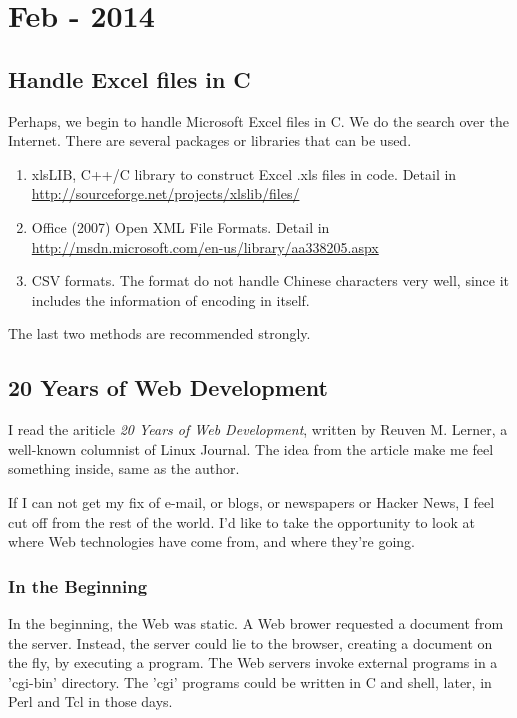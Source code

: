 
\chapter{Feb - 2014} %

\label{ch:feb:2014} %

\section{Handle Excel files in C}
Perhaps, we begin to handle Microsoft Excel files in C.
We do the search over the Internet.
There are several packages or libraries that can be used.
\begin{enumerate}
\item xlsLIB, C++/C library to construct Excel .xls files in code. 
Detail in \url{http://sourceforge.net/projects/xlslib/files/}
\item Office (2007) Open XML File Formats. Detail in \url{http://msdn.microsoft.com/en-us/library/aa338205.aspx}
\item CSV formats. The format do not handle Chinese characters very well, 
since it includes the information of encoding in itself.
\end{enumerate}
The last two methods are recommended strongly. 

\section{20 Years of Web Development}
I read the ariticle {\it 20 Years of Web Development}, written by Reuven M. Lerner, 
a well-known columnist of Linux Journal.
The idea from the article make me feel something inside, same as the author.

If I can not get my fix of e-mail, or blogs, or newspapers or Hacker News,
I feel cut off from the rest of the world.
I'd like to take the opportunity to look at where Web technologies have come from,
and where they're going.

\subsection{In the Beginning}
In the beginning, the Web was static.
A Web brower requested a document from the server.
Instead, the server could lie to the browser,
creating a document on the fly, by executing a program.
The Web servers invoke external programs in a 'cgi-bin' directory.
The 'cgi' programs could be written in C and shell, 
later, in Perl and Tcl in those days.

